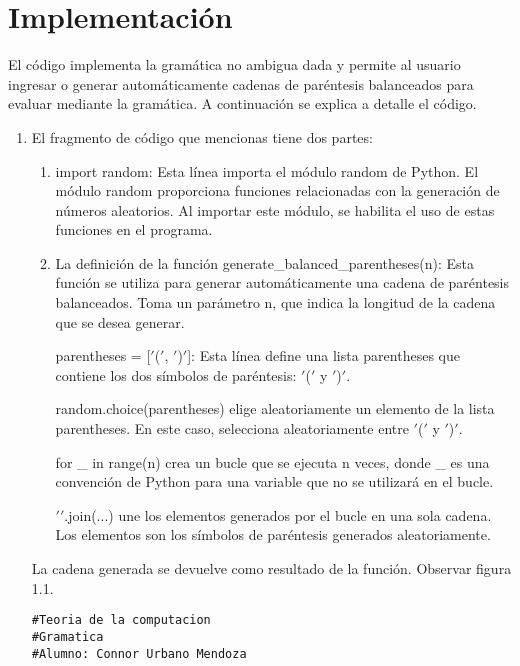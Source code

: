 \section{Implementación} 
El código implementa la gramática no ambigua dada y permite al usuario ingresar o generar automáticamente cadenas de paréntesis balanceados para evaluar mediante la gramática. A continuación se explica a detalle el código.\newline
\newpage
\\
\begin{enumerate}
\item El fragmento de código que mencionas tiene dos partes:
\begin{enumerate}
    \item import random: Esta línea importa el módulo random de Python. El módulo random proporciona funciones relacionadas con la generación de números aleatorios. Al importar este módulo, se habilita el uso de estas funciones en el programa.\newline

    \item La definición de la función generate\_balanced\_parentheses(n): Esta función se utiliza para generar automáticamente una cadena de paréntesis balanceados. Toma un parámetro n, que indica la longitud de la cadena que se desea generar.\newline
    
    parentheses = [$'$($'$, $'$)$'$]: Esta línea define una lista parentheses que contiene los dos símbolos de paréntesis: $'$($'$ y $'$)$'$.\newline
    
    random.choice(parentheses) elige aleatoriamente un elemento de la lista parentheses. En este caso, selecciona aleatoriamente entre $'$($'$ y $'$)$'$.\newline
    
    for \_ in range(n) crea un bucle que se ejecuta n veces, donde \_ es una convención de Python para una variable que no se utilizará en el bucle.\newline
    
    $'$$'$.join(...) une los elementos generados por el bucle en una sola cadena. Los elementos son los símbolos de paréntesis generados aleatoriamente.\newline
\end{enumerate}


La cadena generada se devuelve como resultado de la función. Observar figura 1.1.\newline
\begin{lstlisting}
#Teoria de la computacion
#Gramatica
#Alumno: Connor Urbano Mendoza


\end{lstlisting}
\end{enumerate}
